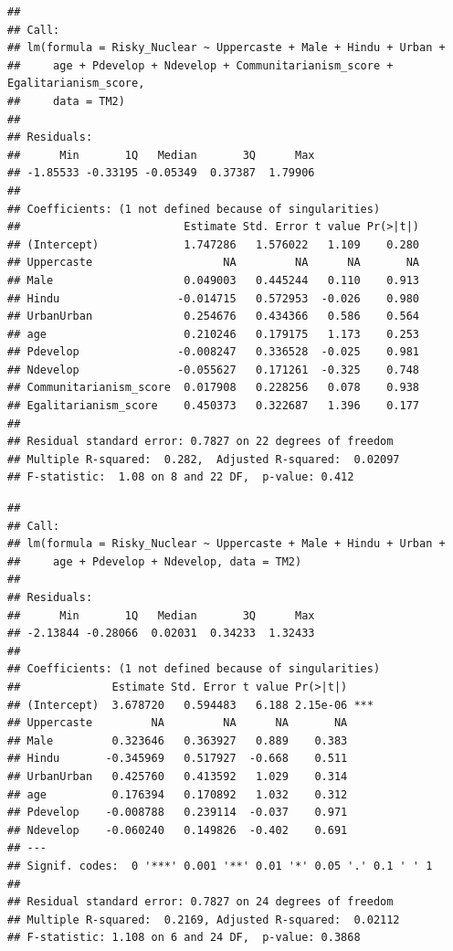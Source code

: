 \documentclass[
]{article}
\begin{document}
\begin{verbatim}
## 
## Call:
## lm(formula = Risky_Nuclear ~ Uppercaste + Male + Hindu + Urban + 
##     age + Pdevelop + Ndevelop + Communitarianism_score + Egalitarianism_score, 
##     data = TM2)
## 
## Residuals:
##      Min       1Q   Median       3Q      Max 
## -1.85533 -0.33195 -0.05349  0.37387  1.79906 
## 
## Coefficients: (1 not defined because of singularities)
##                         Estimate Std. Error t value Pr(>|t|)
## (Intercept)             1.747286   1.576022   1.109    0.280
## Uppercaste                    NA         NA      NA       NA
## Male                    0.049003   0.445244   0.110    0.913
## Hindu                  -0.014715   0.572953  -0.026    0.980
## UrbanUrban              0.254676   0.434366   0.586    0.564
## age                     0.210246   0.179175   1.173    0.253
## Pdevelop               -0.008247   0.336528  -0.025    0.981
## Ndevelop               -0.055627   0.171261  -0.325    0.748
## Communitarianism_score  0.017908   0.228256   0.078    0.938
## Egalitarianism_score    0.450373   0.322687   1.396    0.177
## 
## Residual standard error: 0.7827 on 22 degrees of freedom
## Multiple R-squared:  0.282,  Adjusted R-squared:  0.02097 
## F-statistic:  1.08 on 8 and 22 DF,  p-value: 0.412
\end{verbatim}

\begin{verbatim}
## 
## Call:
## lm(formula = Risky_Nuclear ~ Uppercaste + Male + Hindu + Urban + 
##     age + Pdevelop + Ndevelop, data = TM2)
## 
## Residuals:
##      Min       1Q   Median       3Q      Max 
## -2.13844 -0.28066  0.02031  0.34233  1.32433 
## 
## Coefficients: (1 not defined because of singularities)
##              Estimate Std. Error t value Pr(>|t|)    
## (Intercept)  3.678720   0.594483   6.188 2.15e-06 ***
## Uppercaste         NA         NA      NA       NA    
## Male         0.323646   0.363927   0.889    0.383    
## Hindu       -0.345969   0.517927  -0.668    0.511    
## UrbanUrban   0.425760   0.413592   1.029    0.314    
## age          0.176394   0.170892   1.032    0.312    
## Pdevelop    -0.008788   0.239114  -0.037    0.971    
## Ndevelop    -0.060240   0.149826  -0.402    0.691    
## ---
## Signif. codes:  0 '***' 0.001 '**' 0.01 '*' 0.05 '.' 0.1 ' ' 1
## 
## Residual standard error: 0.7827 on 24 degrees of freedom
## Multiple R-squared:  0.2169, Adjusted R-squared:  0.02112 
## F-statistic: 1.108 on 6 and 24 DF,  p-value: 0.3868
\end{verbatim}
\end{document}
